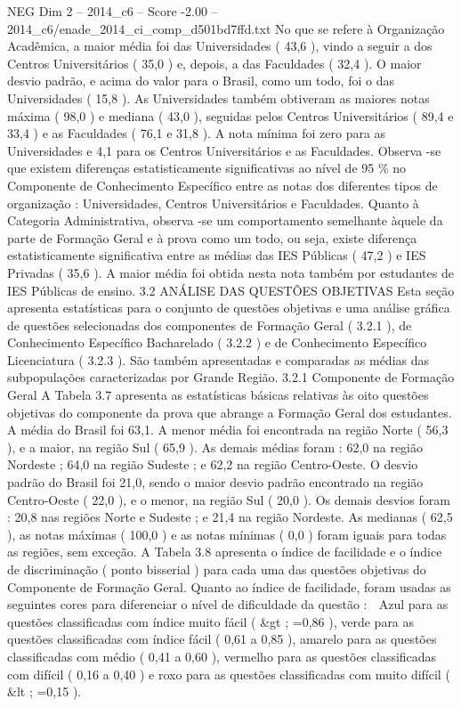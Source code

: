 \begin{textsample}{NEG Dim 2 – 2014\_c6 – Score -2.00 – 2014\_c6/enade\_2014\_ci\_comp\_d501bd7ffd.txt}
No que se refere à Organização Acadêmica, a maior média foi das Universidades ( 43,6 ), vindo a seguir a dos Centros Universitários ( 35,0 ) e, depois, a das Faculdades ( 32,4 ).
O maior desvio padrão, e acima do valor para o Brasil, como um todo, foi o das Universidades ( 15,8 ).
As Universidades também obtiveram as maiores notas máxima ( 98,0 ) e mediana ( 43,0 ), seguidas pelos Centros Universitários ( 89,4 e 33,4 ) e as Faculdades ( 76,1 e 31,8 ).
A nota mínima foi zero para as Universidades e 4,1 para os Centros Universitários e as Faculdades.
Observa -se que existem diferenças estatisticamente significativas ao nível de 95 \% no Componente de Conhecimento Específico entre as notas dos diferentes tipos de organização : Universidades, Centros Universitários e Faculdades.
Quanto à Categoria Administrativa, observa -se um comportamento semelhante àquele da parte de Formação Geral e à prova como um todo, ou seja, existe diferença estatisticamente significativa entre as médias das IES Públicas ( 47,2 ) e IES Privadas ( 35,6 ).
A maior média foi obtida nesta nota também por estudantes de IES Públicas de ensino. 3.2 ANÁLISE DAS QUESTÕES OBJETIVAS Esta seção apresenta estatísticas para o conjunto de questões objetivas e uma análise gráfica de questões selecionadas dos componentes de Formação Geral ( 3.2.1 ), de Conhecimento Específico Bacharelado ( 3.2.2 ) e de Conhecimento Específico Licenciatura ( 3.2.3 ).
São também apresentadas e comparadas as médias das subpopulações caracterizadas por Grande Região. 3.2.1 Componente de Formação Geral A Tabela 3.7 apresenta as estatísticas básicas relativas às oito questões objetivas do componente da prova que abrange a Formação Geral dos estudantes.
A média do Brasil foi 63,1.
A menor média foi encontrada na região Norte ( 56,3 ), e a maior, na região Sul ( 65,9 ).
As demais médias foram : 62,0 na região Nordeste ; 64,0 na região Sudeste ; e 62,2 na região Centro-Oeste.
O desvio padrão do Brasil foi 21,0, sendo o maior desvio padrão encontrado na região Centro-Oeste ( 22,0 ), e o menor, na região Sul ( 20,0 ).
Os demais desvios foram : 20,8 nas regiões Norte e Sudeste ; e 21,4 na região Nordeste.
As medianas ( 62,5 ), as notas máximas ( 100,0 ) e as notas mínimas ( 0,0 ) foram iguais para todas as regiões, sem exceção.
A Tabela 3.8 apresenta o índice de facilidade e o índice de discriminação ( ponto bisserial ) para cada uma das questões objetivas do Componente de Formação Geral.
Quanto ao índice de facilidade, foram usadas as seguintes cores para diferenciar o nível de dificuldade da questão :  Azul para as questões classificadas com índice muito fácil ( \&gt ; =0,86 ), verde para as questões classificadas com índice fácil ( 0,61 a 0,85 ), amarelo para as questões classificadas com médio ( 0,41 a 0,60 ), vermelho para as questões classificadas com difícil ( 0,16 a 0,40 ) e roxo para as questões classificadas com muito difícil ( \&lt ; =0,15 ).

\end{textsample}
